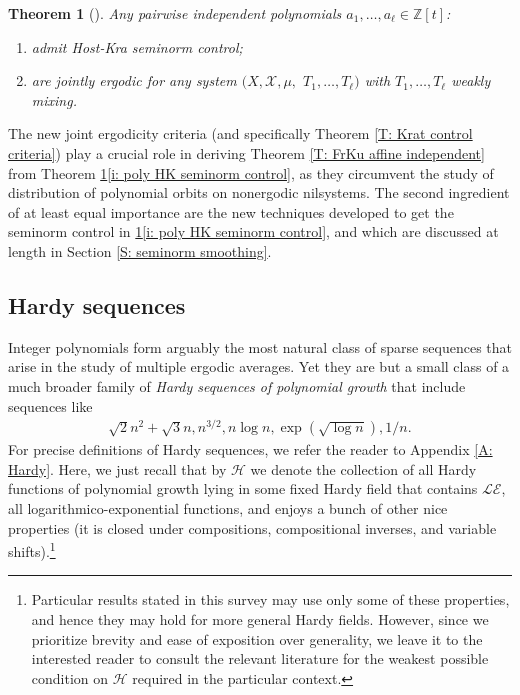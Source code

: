 \documentclass[11pt]{amsart}
\newtheorem{theorem}[lemma]{Theorem}
\theoremstyle{definition}
\newcommand{\Z}{{\mathbb Z}}
\newcommand{\CE}{{\mathcal E}}
\newcommand{\CH}{{\mathcal H}}
\newcommand{\CL}{{\mathcal L}}
\newcommand{\CX}{{\mathcal X}}
\newcommand{\1}{{\mathbf{1}}}
\begin{document}
\begin{theorem}%
[{\cite[Theorem 2.8 and Corollary 2.9]{FrKu22a}}]\label{T: FrKu pairwise affine independent}
    Any pairwise independent polynomials $a_1, \ldots, a_\ell\in\Z[t]$:
    \begin{enumerate}
        \item\label{i: poly HK seminorm control} admit Host-Kra seminorm control;
        \item\label{i: poly weakly mixing} are jointly ergodic for any system $(X, \CX, \mu,$\! $T_1, \ldots, T_\ell)$ with $T_1, \ldots, T_\ell$ weakly mixing.
    \end{enumerate}
\end{theorem}
The new joint ergodicity criteria (and specifically Theorem \ref{T: Krat control criteria}) play a crucial role in deriving Theorem \ref{T: FrKu affine independent} from Theorem \ref{T: FrKu pairwise affine independent}\eqref{i: poly HK seminorm control}, as they circumvent the study of distribution of polynomial orbits on nonergodic nilsystems. The second ingredient of at least equal importance are the new techniques developed to get the seminorm control in \ref{T: FrKu pairwise affine independent}\eqref{i: poly HK seminorm control}, and which are discussed at length in Section \ref{S: seminorm smoothing}.

\subsection{Hardy sequences}
Integer polynomials form arguably the most natural class of sparse sequences that arise in the study of multiple ergodic averages. Yet they are but a small class of a much broader family of \emph{Hardy sequences of polynomial growth} that include sequences like
\begin{align*}
    \sqrt{2}n^2 + \sqrt{3}n, n^{3/2}, n \log n, \exp(\sqrt{\log n}), 1/n.
\end{align*}
For precise definitions of Hardy sequences, we refer the reader to Appendix \ref{A: Hardy}. Here, we just recall that by $\CH$ we denote the collection of all Hardy functions of polynomial growth lying in some fixed Hardy field that contains $\CL\CE$, all logarithmico-exponential functions, and enjoys a bunch of other nice properties (it is closed under compositions, compositional inverses, and variable shifts).\footnote{Particular results stated in this survey may use only some of these properties, and hence they may hold for more general Hardy fields. However, since we prioritize brevity and ease of exposition over generality, we leave it to the interested reader to consult the relevant literature for the weakest possible condition on $\CH$ required in the particular context.}
\end{document}
